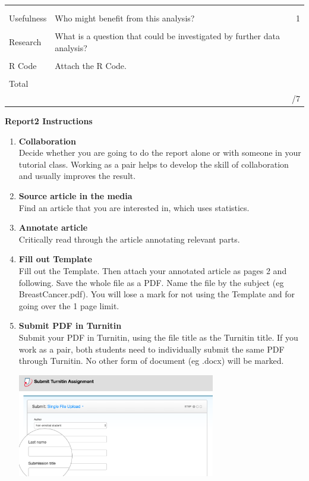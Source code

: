 \documentclass[bigtut]{quiz}\usepackage[]{graphicx}\usepackage[]{color}
\begin{document}
\begin{tutorial}
\begin{tabular}{|l|l|r|}
& & \\
& & \\ \hline
Usefulness & {\tiny Who might benefit from this analysis?} & 1 \\
& & \\
Research & {\tiny What is a question that could be investigated by further data analysis?} &  \\
& & \\
R Code & {\tiny Attach the R Code.} &  \\ 
& & \\ \hline
Total & &  \\ 
& & /7 \\ \hline
\end{tabular}


\newpage
{\bf Report2 Instructions}
\begin{enumerate}
\item {\bf Collaboration} \\
Decide whether you are going to do the report alone or with someone in your tutorial class. Working as a pair helps to develop the skill of collaboration and usually improves the result. \\
\item {\bf Source article in the media} \\
Find an article that you are interested in, which uses statistics. \\
\item {\bf Annotate article} \\
Critically read through the article annotating relevant parts.  \\
\item {\bf Fill out Template} \\
Fill out the Template. Then attach your annotated article as pages 2 and following. Save the whole file as a PDF. Name the file by the subject (eg BreastCancer.pdf). You will lose a mark for not using the Template and for going over the 1 page limit. \\
\item {\bf Submit PDF in Turnitin} \\
Submit your PDF in Turnitin, using the file title as the Turnitin title. If you work as a pair, both students need to individually submit the same PDF through Turnitin. No other form of document (eg .docx) will be marked. \\

\begin{center}
\includegraphics[height=4.5cm]{TurnitinSubmission.png}
\end{center}
\end{enumerate}



\end{tutorial}
\end{document}
